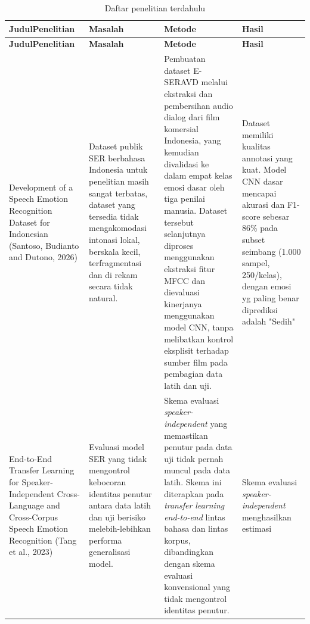 {\small
\begin{longtable}{|p{}|p{}|p{}|p{}|}
  \caption{Daftar penelitian terdahulu}
  \label{tab:2.penelitian_terdahulu} \\
  \hline
  \centering\arraybackslash\textbf{Judul\newline Penelitian} & \centering\arraybackslash\textbf{Masalah} & \centering\arraybackslash\textbf{Metode} & \centering\arraybackslash\textbf{Hasil} \\
  \hline
  \endfirsthead
  \hline
  \centering\arraybackslash\textbf{Judul\newline Penelitian} & \centering\arraybackslash\textbf{Masalah} & \centering\arraybackslash\textbf{Metode} & \centering\arraybackslash\textbf{Hasil} \\
  \hline
  \endhead
  \hline
  \endfoot
  \hline
  \endlastfoot
    Development of a Speech Emotion Recognition Dataset for Indonesian
    (Santoso, Budianto and Dutono, 2026)
    &
    Dataset publik SER berbahasa Indonesia untuk penelitian masih sangat terbatas, dataset yang tersedia tidak mengakomodasi intonasi lokal, berskala kecil, terfragmentasi dan di rekam secara tidak natural.
    &
    Pembuatan dataset E-SERAVD melalui ekstraksi dan pembersihan audio dialog dari film komersial Indonesia, yang kemudian divalidasi ke dalam empat kelas emosi dasar oleh tiga penilai manusia. Dataset tersebut selanjutnya diproses menggunakan ekstraksi fitur MFCC dan dievaluasi kinerjanya menggunakan model CNN, tanpa melibatkan kontrol eksplisit terhadap sumber film
    pada pembagian data latih dan uji.
    &
    Dataset memiliki kualitas annotasi yang kuat. Model CNN dasar mencapai akurasi dan F1-score sebesar 86\% pada subset
    seimbang (1.000 sampel, 250/kelas), dengan emosi yg paling benar diprediksi adalah "Sedih"
    \\
    \hline
    End-to-End Transfer Learning for Speaker-Independent Cross-Language
    and Cross-Corpus Speech Emotion Recognition (Tang et al., 2023)
    &
    Evaluasi model SER yang tidak mengontrol kebocoran identitas
    penutur antara data latih dan uji berisiko melebih-lebihkan
    performa generalisasi model.
    &
    Skema evaluasi \emph{speaker-independent} yang memastikan penutur
    pada data uji tidak pernah muncul pada data latih. Skema ini
    diterapkan pada \emph{transfer learning end-to-end} lintas bahasa
    dan lintas korpus, dibandingkan dengan skema evaluasi konvensional
    yang tidak mengontrol identitas penutur.
    &
    Skema evaluasi \emph{speaker-independent} menghasilkan estimasi

\end{longtable}}
